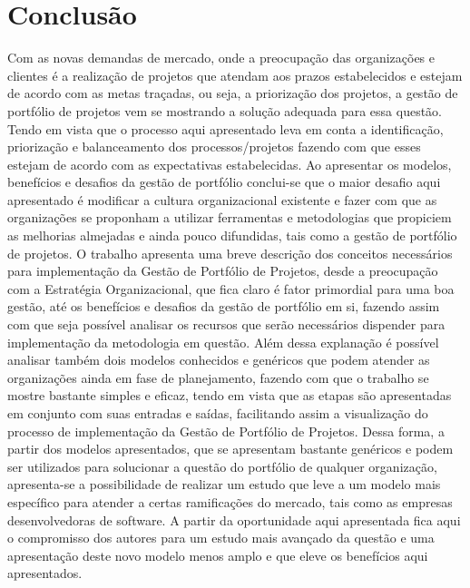 \documentclass[a4paper,10pt]{article}
\begin{document}
\section{Conclusão}
Com as novas demandas de mercado, onde a preocupação das organizações e clientes é a realização de projetos que atendam aos prazos estabelecidos e estejam de acordo com as metas traçadas, ou seja, 
a priorização dos projetos, a gestão de portfólio de projetos vem se mostrando a solução adequada para essa questão. Tendo em vista que o processo aqui apresentado leva em conta a identificação, 
priorização e balanceamento dos processos/projetos fazendo com que esses estejam de acordo com as expectativas estabelecidas. Ao apresentar os modelos, benefícios e desafios da gestão de portfólio 
conclui-se que o maior desafio aqui apresentado é modificar a cultura organizacional existente e fazer com que as organizações se proponham a utilizar ferramentas e metodologias que propiciem as melhorias 
almejadas e ainda pouco difundidas, tais como a gestão de portfólio de projetos.
O trabalho apresenta uma breve descrição dos conceitos necessários para implementação da Gestão de Portfólio de Projetos, desde a preocupação com a Estratégia Organizacional, que fica claro é fator 
primordial para uma boa gestão, até os benefícios e desafios da gestão de portfólio em si, fazendo assim com que seja possível analisar os recursos que serão necessários dispender para implementação da 
metodologia em questão. Além dessa explanação é possível analisar também dois modelos conhecidos e genéricos que podem atender as organizações ainda em fase de planejamento, fazendo com que o trabalho se 
mostre bastante simples e eficaz, tendo em vista que as etapas são apresentadas em conjunto com suas entradas e saídas, facilitando assim a visualização do processo de implementação da Gestão de Portfólio de Projetos.
Dessa forma, a partir dos modelos apresentados, que se apresentam bastante genéricos e podem ser utilizados para solucionar a questão do portfólio de qualquer organização, apresenta-se a possibilidade de realizar um 
estudo que leve a um modelo mais específico para atender a certas ramificações do mercado, tais como as empresas desenvolvedoras de software. A partir da oportunidade aqui apresentada fica aqui o compromisso dos autores 
para um estudo mais avançado da questão e uma apresentação deste novo modelo menos amplo e que eleve os benefícios aqui apresentados.
\end{document}
